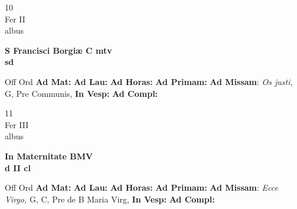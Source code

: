 \documentclass[10pt, openany]{book}
\begin{document}
    \begin{center}
        \begin{minipage}{3.5in}
            \vspace{2em}
            \begin{minipage}{0.5in}
                {\Huge 10} \\
                {\normalsize Fer II} \\
                {\normalsize albus}
            \end{minipage}
            \begin{minipage}{3.0in}
                \textbf{ \large S Francisci Borgiæ C mtv \\
                \textnormal{\normalsize sd}} \\ 
            \end{minipage}
            \begin{justify}Off Ord
                \textbf{Ad Mat: }
                \textbf{Ad Lau: }
                \textbf{Ad Horas: }
                \textbf{Ad Primam: }\textbf{Ad Missam}: \textit{Os justi,} G, Pre Communis,  
                \textbf{In Vesp: }
                \textbf{Ad Compl: }
            \end{justify}
        \end{minipage}
    \end{center}

    \begin{center}
        \begin{minipage}{3.5in}
            \vspace{2em}
            \begin{minipage}{0.5in}
                {\Huge 11} \\
                {\normalsize Fer III} \\
                {\normalsize albus}
            \end{minipage}
            \begin{minipage}{3.0in}
                \textbf{ \large In Maternitate BMV \\
                \textnormal{\normalsize d II cl}} \\ 
            \end{minipage}
            \begin{justify}Off Ord
                \textbf{Ad Mat: }
                \textbf{Ad Lau: }
                \textbf{Ad Horas: }
                \textbf{Ad Primam: }\textbf{Ad Missam}: \textit{Ecce Virgo,} G, C, Pre de B Maria Virg,  
                \textbf{In Vesp: }
                \textbf{Ad Compl: }
            \end{justify}
        \end{minipage}
    \end{center}
\end{document}
